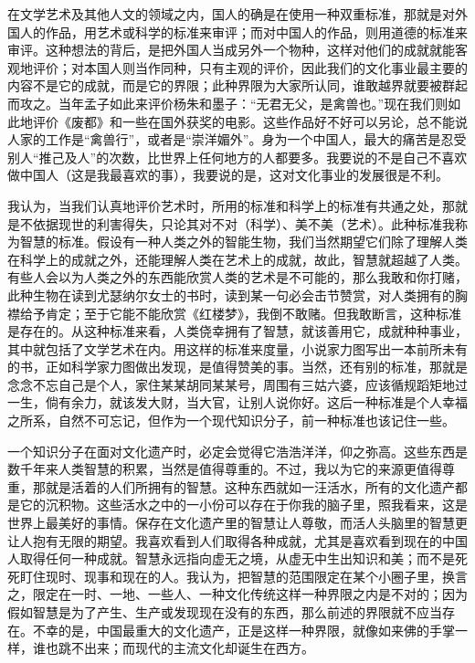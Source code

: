在文学艺术及其他人文的领域之内，国人的确是在使用一种双重标准，那就是对外国人的作品，用艺术或科学的标准来审评；而对中国人的作品，则用道德的标准来审评。这种想法的背后，是把外国人当成另外一个物种，这样对他们的成就就能客观地评价；对本国人则当作同种，只有主观的评价，因此我们的文化事业最主要的内容不是它的成就，而是它的界限；此种界限为大家所认同，谁敢越界就要被群起而攻之。当年孟子如此来评价杨朱和墨子：“无君无父，是禽兽也。”现在我们则如此地评价《废都》和一些在国外获奖的电影。这些作品好不好可以另论，总不能说人家的工作是“禽兽行”，或者是“崇洋媚外”。身为一个中国人，最大的痛苦是忍受别人“推己及人”的次数，比世界上任何地方的人都要多。我要说的不是自己不喜欢做中国人（这是我最喜欢的事），我要说的是，这对文化事业的发展很是不利。 

我认为，当我们认真地评价艺术时，所用的标准和科学上的标准有共通之处，那就是不依据现世的利害得失，只论其对不对（科学）、美不美（艺术）。此种标准我称为智慧的标准。假设有一种人类之外的智能生物，我们当然期望它们除了理解人类在科学上的成就之外，还能理解人类在艺术上的成就，故此，智慧就超越了人类。有些人会以为人类之外的东西能欣赏人类的艺术是不可能的，那么我敢和你打赌，此种生物在读到尤瑟纳尔女士的书时，读到某一句必会击节赞赏，对人类拥有的胸襟给予肯定；至于它能不能欣赏《红楼梦》，我倒不敢赌。但我敢断言，这种标准是存在的。从这种标准来看，人类侥幸拥有了智慧，就该善用它，成就种种事业，其中就包括了文学艺术在内。用这样的标准来度量，小说家力图写出一本前所未有的书，正如科学家力图做出发现，是值得赞美的事。当然，还有别的标准，那就是念念不忘自己是个人，家住某某胡同某某号，周围有三姑六婆，应该循规蹈矩地过一生，倘有余力，就该发大财，当大官，让别人说你好。这后一种标准是个人幸福之所系，自然不可忘记，但作为一个现代知识分子，前一种标准也该记住一些。 

一个知识分子在面对文化遗产时，必定会觉得它浩浩洋洋，仰之弥高。这些东西是数千年来人类智慧的积累，当然是值得尊重的。不过，我以为它的来源更值得尊重，那就是活着的人们所拥有的智慧。这种东西就如一汪活水，所有的文化遗产都是它的沉积物。这些活水之中的一小份可以存在于你我的脑子里，照我看来，这是世界上最美好的事情。保存在文化遗产里的智慧让人尊敬，而活人头脑里的智慧更让人抱有无限的期望。我喜欢看到人们取得各种成就，尤其是喜欢看到现在的中国人取得任何一种成就。智慧永远指向虚无之境，从虚无中生出知识和美；而不是死死盯住现时、现事和现在的人。我认为，把智慧的范围限定在某个小圈子里，换言之，限定在一时、一地、一些人、一种文化传统这样一种界限之内是不对的；因为假如智慧是为了产生、生产或发现现在没有的东西，那么前述的界限就不应当存在。不幸的是，中国最重大的文化遗产，正是这样一种界限，就像如来佛的手掌一样，谁也跳不出来；而现代的主流文化却诞生在西方。 

